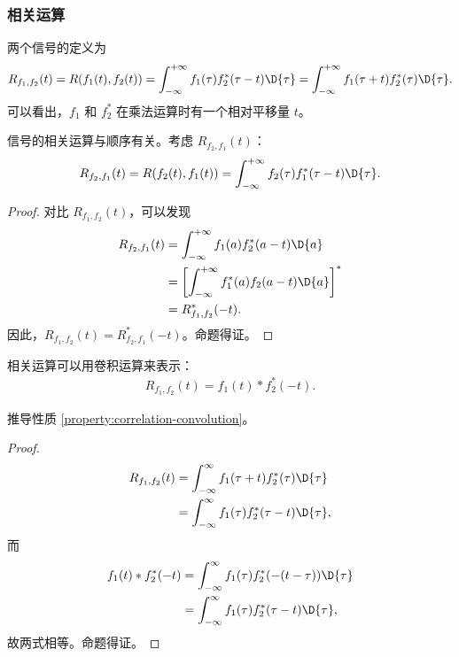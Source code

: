 \subsubsection{相关运算}

\begin{definition}
    两个信号的定义为
    \begin{align*}
        R_{f_1, f_2}(t)
        = R(f_1(t), f_2(t))
        = \int_{-\infty}^{+\infty}f_1(\tau)f_2^*(\tau - t)\D{\tau}
        = \int_{-\infty}^{+\infty}f_1(\tau + t)f_2^*(\tau)\D{\tau}.
    \end{align*}
    可以看出，$f_1$ 和 $f_2^*$ 在乘法运算时有一个相对平移量 $t$。
\end{definition}

\begin{property}
    信号的相关运算与顺序有关。考虑 $R_{f_2, f_1}(t)$：
    \begin{align*}
        R_{f_2, f_1}(t) = R(f_2(t), f_1(t)) = \int_{-\infty}^{+\infty}f_2(\tau)f_1^*(\tau - t)\D{\tau}.
    \end{align*}
\end{property}

\begin{proof}
    对比 $R_{f_1, f_2}(t)$，可以发现
    \begin{align*}
        R_{f_2, f_1}(t) & = \int_{-\infty}^{+\infty}f_1(a)f_2^*(a - t)\D{a} \\
        & = \left[\int_{-\infty}^{+\infty}f_1^*(a)f_2(a - t)\D{a}\right]^* \\
        & = R_{f_1, f_2}^*(-t).
    \end{align*}
    因此，$R_{f_1, f_2}(t) = R_{f_2, f_1}^*(-t)$。命题得证。
\end{proof}

\begin{property}[相关运算与卷积运算的关系]
    \label{property:correlation-convolution}
    相关运算可以用卷积运算来表示：
    \begin{align*}
        R_{f_1, f_2}(t) = f_1(t) * f_2^*(-t).
    \end{align*}
\end{property}

\begin{exercise}
    推导性质 \ref{property:correlation-convolution}。
\end{exercise}

\begin{proof}
    \begin{align*}
        R_{f_1,f_2}(t) & = \int_{-\infty}^\infty f_1(\tau + t)f_2^*(\tau)\D{\tau} \\
        & = \int_{-\infty}^\infty f_1(\tau)f_2^*(\tau-t)\D{\tau},
    \end{align*}
    而
    \begin{align*}
        f_1(t)*f_2^*(-t) & = \int_{-\infty}^{\infty}f_1(\tau)f_2^*(-(t - \tau))\D{\tau} \\
        & = \int_{-\infty}^{\infty}f_1(\tau)f_2^*(\tau - t)\D{\tau},
    \end{align*}
    故两式相等。命题得证。
\end{proof}

